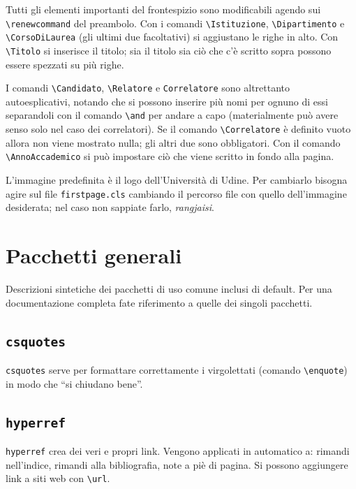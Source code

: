 \documentclass[italian]{tesina-class/tesina}
\theoremstyle{definition}
\theoremstyle{plain}
\renewcommand{\Istituzione}{Università degli Studi di Udine}
\renewcommand{\Dipartimento}{Scuola Superiore Universitaria \\ \enquote{Di Toppo-Wassermann}}
\renewcommand{\Titolo}{Titolo della tesina \\ anche \\ su \\ più \\ righe}
\renewcommand{\Candidato}{Candidato}
\renewcommand{\Relatore}{Prof. Relatore}
\renewcommand{\Correlatore}{}
\renewcommand{\AnnoAccademico}{Anno Accademico 2026/2027}
\begin{document}
Tutti gli elementi importanti del frontespizio sono modificabili agendo sui \verb|\renewcommand| del preambolo.
Con i comandi \verb|\Istituzione|, \verb|\Dipartimento| e \verb|\CorsoDiLaurea| (gli ultimi due facoltativi) si aggiustano le righe in alto.
Con \verb|\Titolo| si inserisce il titolo; sia il titolo sia ciò che c'è scritto sopra possono essere spezzati su più righe.

I comandi \verb|\Candidato|, \verb|\Relatore| e \verb|Correlatore| sono altrettanto autoesplicativi, notando che si possono inserire più nomi per ognuno di essi separandoli con il comando \verb|\and| per andare a capo (materialmente può avere senso solo nel caso dei correlatori).
Se il comando \verb|\Correlatore| è definito vuoto allora non viene mostrato nulla; gli altri due sono obbligatori.
Con il comando \verb|\AnnoAccademico| si può impostare ciò che viene scritto in fondo alla pagina.

L'immagine predefinita è il logo dell'Università di Udine.
Per cambiarlo bisogna agire sul file \verb|firstpage.cls| cambiando il percorso file con quello dell'immagine desiderata; nel caso non sappiate farlo, \emph{rangjaisi}.





\section{Pacchetti generali}

Descrizioni sintetiche dei pacchetti di uso comune inclusi di default.
Per una documentazione completa fate riferimento a quelle dei singoli pacchetti.

\subsection{\texttt{csquotes}}

\verb|csquotes| serve per formattare correttamente i virgolettati (comando \verb|\enquote|) in modo che \enquote{si chiudano bene}.

\subsection{\texttt{hyperref}}

\verb|hyperref| crea dei veri e propri link.
Vengono applicati in automatico a: rimandi nell'indice, rimandi alla bibliografia, note a piè di pagina. Si possono aggiungere link a siti web con \verb|\url|.
\end{document}
